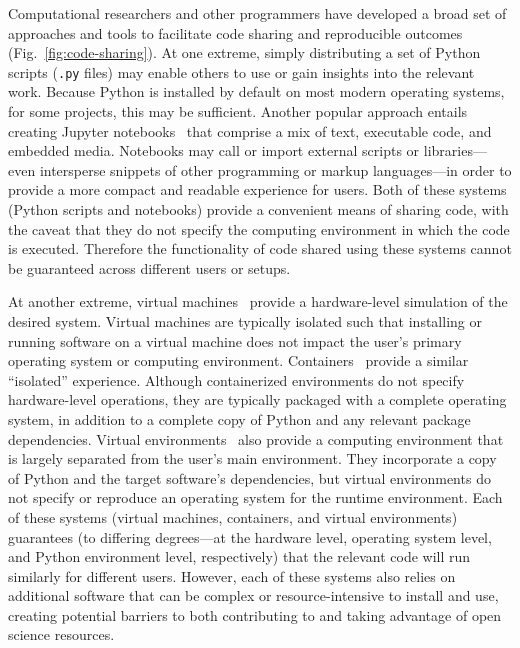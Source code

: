 \documentclass[preprint,12pt,a4paper]{elsarticle}
\begin{document}
Computational researchers and other programmers have de\-vel\-oped a broad
set of approaches and tools to facilitate code sharing and
reproducible outcomes (Fig.~\ref{fig:code-sharing}). At one
extreme, simply distributing a set of Python scripts (\texttt{.py} files) may
enable others to use or gain insights into the relevant work. Because
Python is installed by default on most modern operating systems, for
some projects, this may be sufficient. Another popular approach
entails creating Jupyter
notebooks~\cite{KluyEtal16} that comprise a mix of text, executable
code, and embedded media. Notebooks may call or import external
scripts or libraries---even intersperse snippets of other programming
or markup lang\-uages---in order to provide a more compact and readable
experience for users. Both of these systems (Python scripts and
notebooks) provide a convenient means of sharing code, with the
caveat that they do not specify the computing environment in which the
code is executed. Therefore the functionality of code shared using
these systems cannot be guaranteed across different users or setups.

At another extreme, virtual machines~\cite{Gold74, AltiEtal05,
 Rose99} provide a hardware-level simulation of the desired system.
Virtual machines are typically isolated such
that installing or running software on a virtual machine does not
impact the user's primary operating system or computing environment.
Containers~\cite[e.g.,][]{Merk14, KurtEtal17} provide a similar
``isolated'' experience. Although containerized environments do not
specify hardware-level operations, they are typically packaged with a
complete operating system, in addition to a complete copy of Python
and any relevant package dependencies. Virtual
environments~\cite[e.g.,][]{Anac12, Eust19} also provide a computing
environment that is largely separated from the user's main
environment. They incorporate a copy of Python and the target
software's dependencies, but virtual environments do not specify or
reproduce an operating system for the runtime environment. Each of
these systems (virtual machines, containers, and virtual environments)
guarantees (to differing degrees---at the hardware level, operating
system level, and Python environment level, respectively) that the
relevant code will run similarly for different users. However, each
of these systems also relies on additional software that can be
complex or resource-intensive to install and use, creating potential
barriers to both contributing to and taking advantage of open science
resources.
\end{document}

